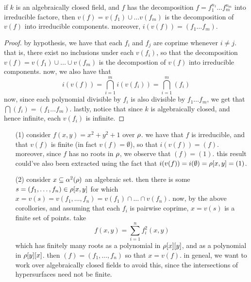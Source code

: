 \begin{corollary}
    if $k$ is an algebraically closed field, and $f$ has the decomposition
    $f=f_1^{n_1} \dots f_m^{n_m}$ into irreducible factore, then $v(f)=v(f_1)
    \cup \dots v(f_m)$ is the decomposition of $v(f)$ into irreducible
    components. moreover, $i(v(f))=(f_1 \dots f_m)$.
\end{corollary}
\begin{proof}
    by hypothesis, we have that each $f_i$ and $f_j$ are coprime whenever $i
    \neq j$. that is, there exist no inclusions under each $v(f_i)$, so that the
    decomposition $v(f)=v(f_1) \cup \dots \cup v(f_m)$ is the decompostion of
    $v(f)$ into irreducible components. now, we also have that
    \begin{equation*}
        i(v(f))=\bigcap_{i=1}^m{i(v(f_i))}=\bigcap_{i=1}^m{(f_i)}
    \end{equation*}
    now, since each polynomial divisible by $f_i$ is also divisible by $f_1
    \dots f_m$, we get that $\bigcap{(f_i)}=(f_1 \dots f_m)$. lastly, notice
    that since $k$ is algebraically closed, and hence infinite, each $v(f_i)$ is
    infinite.
\end{proof}

\begin{example}\label{example_1.14}
    \begin{enumerate}
        \item[(1)] consider $f(x,y)=x^2+y^2+1$ over $\rho$. we have that $f$ is
            irreducible, and that $v(f)$ is finite (in fact $v(f)=\emptyset$),
            so that $i(v(f))=(f)$. moreover, since $f$ has no roots in $\rho$, we
            observe that $(f)=(1)$. this result could've also been extracted
            using the fact that $i(v(f))=i(\emptyset)=\rho[x,y]=(1)$.

        \item[(2)] consider $x \subseteq \alpha^2(\rho)$ an algebraic set. then there
            is some $s=(f_1, \dots, f_n) \in \rho[x,y]$ for which $x=v(s)=v(f_1,
            \dots, f_n)=v(f_1) \cap \dots \cap v(f_n)$. now, by the above
            corollories, and assuming that each $f_i$ is pairwise coprime,
            $x=v(s)$ is a finite set of points. take
            \begin{equation*}
                f(x,y)=\sum_{i=1}^n{f_i^2(x,y)}
            \end{equation*}
            which has finitely many roots as a polynomial in $\rho[x][y]$, and as
            a polynomial in $\rho[y][x]$. then $(f)=(f_1, \dots ,f_n)$ so that
            $x=v(f)$. in geneal, we want to work over algebraically closed
            fields to avoid this, since the intersections of hypersurfaces need
            not be finite.
    \end{enumerate}
\end{example}

